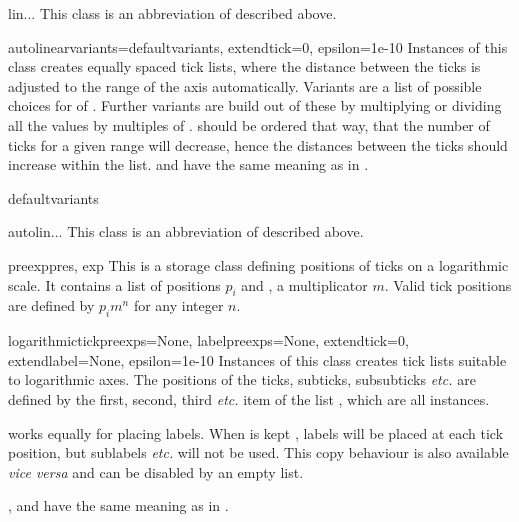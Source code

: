\begin{classdesc}{lin}{...}
This class is an abbreviation of  described above.
\end{classdesc}

\begin{classdesc}{autolinear}{variants=defaultvariants,
                              extendtick=0,
                              epsilon=1e-10}
  Instances of this class creates equally spaced tick lists, where the
  distance between the ticks is adjusted to the range of the axis
  automatically. Variants are a list of possible choices for
   of . Further variants are build out of
  these by multiplying or dividing all the values by multiples of
  .  should be ordered that way, that the
  number of ticks for a given range will decrease, hence the distances
  between the ticks should increase within the  list.
   and  have the same meaning as in
  .
\end{classdesc}

\begin{memberdesc}{defaultvariants}
\end{memberdesc}

\begin{classdesc}{autolin}{...}
This class is an abbreviation of  described above.
\end{classdesc}

\begin{classdesc}{preexp}{pres, exp}
  This is a storage class defining positions of ticks on a
  logarithmic scale. It contains a list  of positions $p_i$
  and , a multiplicator $m$. Valid tick positions are defined
  by $p_im^n$ for any integer $n$.
\end{classdesc}

\begin{classdesc}{logarithmic}{tickpreexps=None, labelpreexps=None,
                               extendtick=0, extendlabel=None,
                               epsilon=1e-10}
  Instances of this class creates tick lists suitable to logarithmic
  axes. The positions of the ticks, subticks, subsubticks \emph{etc.}
  are defined by the first, second, third \emph{etc.} item of the list
  , which are all  instances.

   works equally for placing labels. When 
  is kept , labels will be placed at each tick position,
  but sublabels \emph{etc.} will not be used. This copy behaviour is
  also available \emph{vice versa} and can be disabled by an empty
  list.

  ,  and  have the same
  meaning as in .
\end{classdesc}

